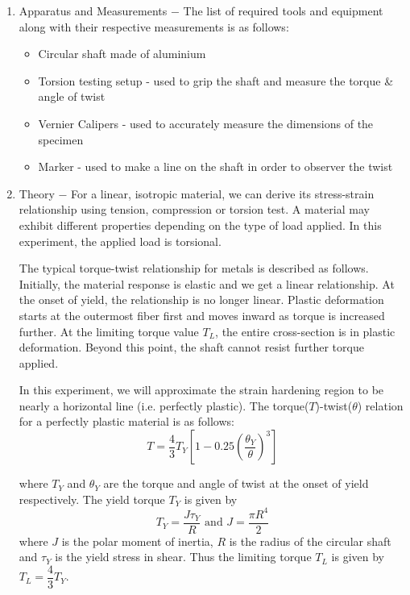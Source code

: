 \documentclass[a4paper, 11pt]{article}
\begin{document}
\begin{enumerate}[label=(\alph*)]
	\item { Apparatus and Measurements} $-$ The list of required tools and equipment along with their respective measurements is as follows:
\vspace{-2mm}

	\begin{itemize}
		\item Circular shaft made of aluminium
		\item Torsion testing setup	- used to grip the shaft and measure the torque \& angle of twist
		\item Vernier Calipers - used to accurately measure the dimensions of the specimen
		\item Marker - used to make a line on the shaft in order to observer the twist
	\end{itemize}
	
	\item {Theory} $-$ For a linear, isotropic material, we can derive its stress-strain relationship using tension, compression or torsion test. A material may exhibit different properties depending on the type of load applied. In this experiment, the applied load is torsional.
	
	The typical torque-twist relationship for metals is described as follows. Initially, the material response is elastic and we get a linear relationship. At the onset of yield, the relationship is no longer linear. Plastic deformation starts at the outermost fiber first and moves inward as torque is increased further. At the limiting torque value $T_L$, the entire cross-section is in plastic deformation. Beyond this point, the shaft cannot resist further torque applied.
	
	In this experiment, we will approximate the strain hardening region to be nearly a horizontal line (i.e. perfectly plastic). The torque($T$)-twist($\theta$) relation for a perfectly plastic material is as follows:
	$$T=\dfrac{4}{3}T_Y\left[1-0.25\left(\dfrac{\theta_Y}{\theta}\right)^3\right]$$

	where $T_Y$ and $\theta_Y$ are the torque and angle of twist at the onset of yield respectively. The yield torque $T_Y$ is given by
	$$T_Y=\dfrac{J\tau_Y}{R}\text{ and } J=\dfrac{\pi R^4}{2}$$
	where $J$ is the polar moment of inertia, $R$ is the radius of the circular shaft and $\tau_Y$ is the yield stress in shear. Thus the limiting torque $T_L$ is given by $T_L=\dfrac{4}{3}T_Y $.


\end{enumerate}
\end{document}
